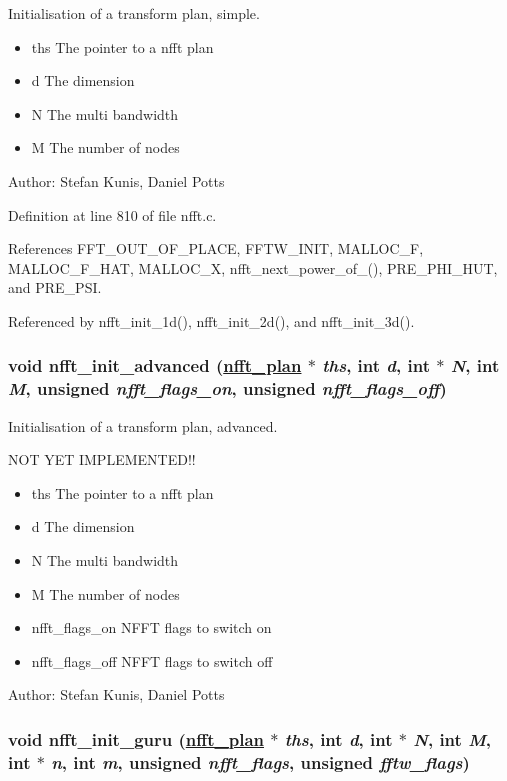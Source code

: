 Initialisation of a transform plan, simple. 

\begin{itemize}
\item ths The pointer to a nfft plan \item d The dimension \item N The multi bandwidth \item M The number of nodes\end{itemize}
\begin{Desc}
\item[Author:]Stefan Kunis, Daniel Potts \end{Desc}


Definition at line 810 of file nfft.c.

References FFT\_\-OUT\_\-OF\_\-PLACE, FFTW\_\-INIT, MALLOC\_\-F, MALLOC\_\-F\_\-HAT, MALLOC\_\-X, nfft\_\-next\_\-power\_\-of\_(), PRE\_\-PHI\_\-HUT, and PRE\_\-PSI.

Referenced by nfft\_\-init\_\-1d(), nfft\_\-init\_\-2d(), and nfft\_\-init\_\-3d().\hypertarget{group__nfft_ga8}{
\subsubsection[nfft\_\-init\_\-advanced]{\setlength{\rightskip}{0pt plus 5cm}void nfft\_\-init\_\-advanced (\hyperlink{structnfft__plan}{nfft\_\-plan} $\ast$ {\em ths}, int {\em d}, int $\ast$ {\em N}, int {\em M}, unsigned {\em nfft\_\-flags\_\-on}, unsigned {\em nfft\_\-flags\_\-off})}}
\label{group__nfft_ga8}


Initialisation of a transform plan, advanced. 

NOT YET IMPLEMENTED!!

\begin{itemize}
\item ths The pointer to a nfft plan \item d The dimension \item N The multi bandwidth \item M The number of nodes \item nfft\_\-flags\_\-on NFFT flags to switch on \item nfft\_\-flags\_\-off NFFT flags to switch off\end{itemize}
\begin{Desc}
\item[Author:]Stefan Kunis, Daniel Potts \end{Desc}
\hypertarget{group__nfft_ga9}{
\subsubsection[nfft\_\-init\_\-guru]{\setlength{\rightskip}{0pt plus 5cm}void nfft\_\-init\_\-guru (\hyperlink{structnfft__plan}{nfft\_\-plan} $\ast$ {\em ths}, int {\em d}, int $\ast$ {\em N}, int {\em M}, int $\ast$ {\em n}, int {\em m}, unsigned {\em nfft\_\-flags}, unsigned {\em fftw\_\-flags})}}
\label{group__nfft_ga9}


